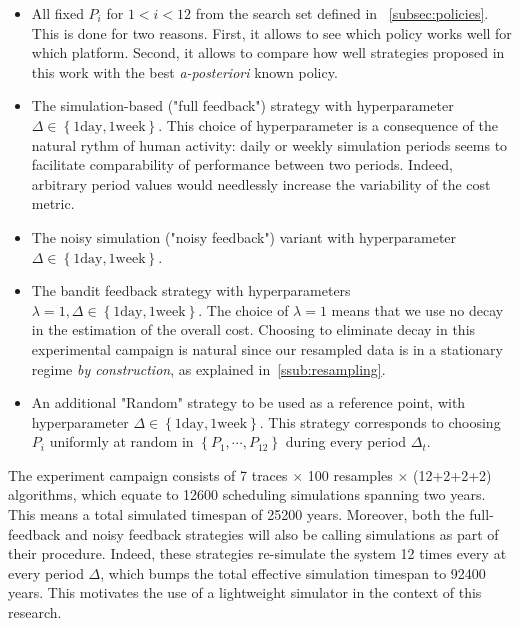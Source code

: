 \documentclass[sigconf,anonymous]{acmart}
\begin{document}
\begin{itemize}

  \item All fixed $P_i$ for $1<i<12$ from the search set defined in
    ~\ref{subsec:policies}.  This is done for two reasons. First, it allows to
    see which policy works well for which platform. Second, it allows to
    compare how well strategies proposed in this work with the best
    \textit{a-posteriori} known policy.

  \item The simulation-based ("full feedback") strategy with hyperparameter
    $\Delta \in \left\{ 1 \text{day},1 \text{week} \right\}$. This choice of
    hyperparameter is a consequence of the natural rythm of human activity:
    daily or weekly simulation periods seems to facilitate comparability of
    performance between two periods. Indeed, arbitrary period values would
    needlessly increase the variability of the cost metric.

  \item The noisy simulation ("noisy feedback") variant with hyperparameter
    $\Delta \in \left\{ 1 \text{day},1 \text{week} \right\}$.

  \item The bandit feedback strategy with hyperparameters $\lambda=1, \Delta
    \in \left\{ 1 \text{day},1 \text{week} \right\}$. The choice of $\lambda=1$
    means that we use no decay in the estimation of the overall cost. Choosing
    to eliminate decay in this experimental campaign is natural since our
    resampled data is in a stationary regime \textit{by construction}, as
    explained in~\ref{ssub:resampling}.

  \item An additional "Random" strategy to be used as a reference point, with
    hyperparameter $ \Delta \in \left\{ 1 \text{day},1 \text{week} \right\}$.
    This strategy corresponds to choosing $P_i$ uniformly at random in $\left\{
      P_1 , \cdots, P_{12} \right\}$ during every period $\Delta_t$.

\end{itemize}

The experiment campaign consists of 7 traces $\times$ 100 resamples $\times$
(12+2+2+2) algorithms, which equate to 12600 scheduling simulations spanning
two years.  This means a total simulated timespan of 25200 years. Moreover,
both the full-feedback and noisy feedback strategies will also be calling
simulations as part of their procedure. Indeed, these strategies re-simulate
the system 12 times every at every period $\Delta$, which bumps the total
effective simulation timespan to 92400 years. This motivates the use of a
lightweight simulator in the context of this research.
\end{document}
